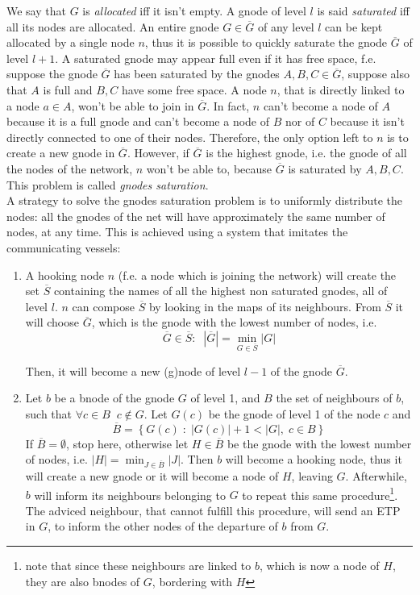 \documentclass[a4paper]{article}
\newcommand{\pgra}[1]{\left\{#1\right\}}
\def\ove#1{{\overline{#1}}}
\def\0{{\emptyset}}
\begin{document}
We say that $G$ is \emph{allocated} iff it isn't empty. A gnode of level $l$ is said
\emph{saturated} iff all its nodes are allocated.
An entire gnode $G\in \ove G$ of any level $l$ can be kept allocated by a single node $n$,
thus it is possible to quickly saturate the gnode $\ove G$ of level $l+1$. 
A saturated gnode may appear full even if it has free space, f.e. suppose the
gnode $\ove G$ has been saturated by the gnodes $A,B,C \in \ove G$, suppose
also that $A$ is full and $B,C$ have some free space.
A node $n$, that is directly linked to a node $a\in A$, won't be
able to join in $\ove G$. In fact, $n$ can't become a node of $A$ because it is
a full gnode and can't become a node of $B$ nor of $C$ because it isn't directly
connected to one of their nodes. Therefore, the only option left to $n$ is to
create a new gnode in $\ove G$. However, if $\ove G$ is the highest gnode,
i.e. the gnode of all the nodes of the network, $n$ won't be able to,
because $\ove G$ is saturated by $A,B,C$. This problem is called \emph{gnodes
saturation}.\\

A strategy to solve the gnodes saturation problem is to uniformly distribute
the nodes: all the gnodes of the net will have approximately the same number
of nodes, at any time. This is achieved using a system that imitates the
communicating vessels:
\begin{enumerate}
	\item \label{steponecv}A hooking node $n$ (f.e. a node which is joining the network) will
		create the set $\ove S$ containing the names of all the
		highest non saturated gnodes, all of level $l$. $n$ can
		compose $\ove S$ by looking in the maps of its neighbours.
		From $\ove S$ it will choose $\ove G$, which is the gnode with
		the lowest number of nodes, i.e.
		\[
		\ove G \in \ove S:\;\;|\ove G| = \min_{G \in \ove S} |G|
		\]

		Then, it will become a new (g)node of level $l-1$ of the gnode $\ove G$.

	\item \label{steptwocv} Let $b$ be a bnode of the gnode $G$ of level 1, and $B$ the set
	      of neighbours of $b$, such that $\forall c\in B\;\;c\notin G$.
	      Let $G(c)$ be the gnode of level 1 of the node $c$ and
	      \[
	      \ove B=\pgra{G(c)\;:\;|G(c)|+1 < |G|,\;c\in B}
	      \]
	      If $\ove B=\0$, stop here, otherwise let $H \in \ove B$ be the gnode with
	      the lowest number of nodes, i.e. $|H|=\min_{J\in \ove B} |J|$.
	      Then $b$ will become a hooking node, thus it will create a new gnode or it will become
	      a node of $H$, leaving $G$. Afterwhile, $b$ will inform its
	      neighbours belonging to $G$ to repeat this same
	      procedure\footnote{note that since these neighbours are linked
	      to $b$, which is now a node of $H$, they are also bnodes of
	      $G$, bordering with $H$}. The adviced neighbour, that cannot fulfill this
	      procedure, will send an ETP in $G$, to inform the other nodes of
	      the departure of $b$ from $G$.
\end{enumerate}
\end{document}
